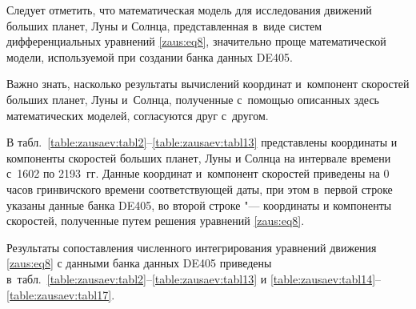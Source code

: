 Следует отметить, что математическая модель для исследования движений больших планет, Луны и Солнца, представленная в~виде систем дифференциальных уравнений \eqref{zaus:eq8}, значительно проще математической модели, используемой при создании банка данных DE405.

Важно знать, насколько результаты вычислений координат и~компонент скоростей больших планет, Луны и~Солнца, полученные с~помощью описанных здесь математических моделей, согласуются друг с~другом.



В табл.~\ref{table:zausaev:tabl2}--\ref{table:zausaev:tabl13} представлены координаты и компоненты скоростей больших планет, Луны и Солнца на интервале времени с~1602 по 2193~гг.  
Данные координат и~компонент скоростей приведены на 0 часов гринвичского времени соответствующей даты, при этом в~первой строке указаны данные банка DE405, во второй строке "--- координаты и компоненты скоростей,  полученные путем решения уравнений \eqref{zaus:eq8}.

Результаты сопоставления численного интегрирования уравнений движения \eqref{zaus:eq8} с данными банка данных DE405 приведены в~табл.~\ref{table:zausaev:tabl2}--\ref{table:zausaev:tabl13} и \ref{table:zausaev:tabl14}--\ref{table:zausaev:tabl17}.


